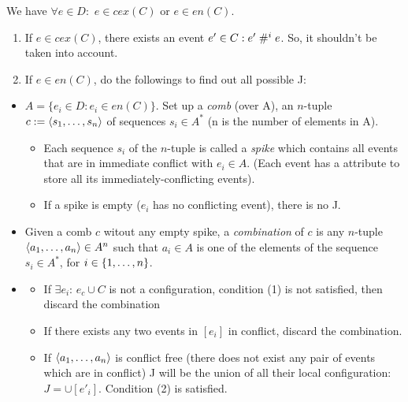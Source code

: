 \documentclass{llncs}
\begin{document}
\noindent
We have $\forall e \in D: $ $e \in cex(C)$ or $e \in en(C)$.
\begin{enumerate}
\item
	If  $e \in cex(C)$, there exists an event $e' \in C: e' \mathrel{\#^i_{}} e$. So, it shouldn't be taken into account.
\item
	If $e \in en(C)$, do the followings to find out all possible J:
\end{enumerate}

\begin{itemize}
\item 
	$A = \{e_i \in D: e_i \in en(C)\}$. 
	Set up a \emph{comb} (over A), an $n$-tuple
	$c \mathrel{:=} \langle s_1, \ldots, s_n\rangle$ of sequences $s_i \in A^*$
	(n is the number of elements in A).
	\begin{itemize}
	\item
		Each sequence $s_i$ of the $n$-tuple is called a \emph{spike} which contains all events that are in immediate conflict with $e_{i} \in A$. (Each event has a attribute to store all its immediately-conflicting events).
	\item
		If a spike is empty ($e_i$ has no conflicting event), there is no J.
	\end{itemize}
	
\item
	Given a comb $c$ witout any empty spike, a \emph{combination} of $c$ is any $n$-tuple $\langle a_1, \ldots, a_n\rangle \in A^n$ such that $a_i \in A$ is one of the elements of the sequence $s_i \in A^*$, for
	$i \in {\{ 1, \ldots, n \mathclose \}}$.
\item
	\begin{itemize}
	\item
		If $\exists e_i$: $e_c \cup C$ is not a configuration, condition (1) is not satisfied, then discard the combination
	\item
		If there exists any two events in $[e_i]$ in conflict, discard the combination.
	\item
		If $\langle a_1, \ldots, a_n\rangle$ is conflict free (there does not exist any pair of events which are in conflict) J will be the union of all their local configuration: $ J = \cup [e'_i]$. Condition (2) is satisfied.
	\end{itemize}
\end{itemize}
\end{document}

